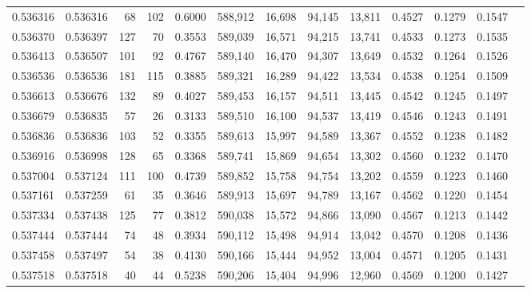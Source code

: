 \begin{tabular}{rrrrrrrrrrrrr}
0.536316 & 0.536316 &    68 &   102 &                                     0.6000 & 588,912 &  16,698 &  94,145 &  13,811 & 0.4527 & 0.1279 & 0.1547 \\
0.536370 & 0.536397 &   127 &    70 &                                     0.3553 & 589,039 &  16,571 &  94,215 &  13,741 & 0.4533 & 0.1273 & 0.1535 \\
0.536413 & 0.536507 &   101 &    92 &                                     0.4767 & 589,140 &  16,470 &  94,307 &  13,649 & 0.4532 & 0.1264 & 0.1526 \\
0.536536 & 0.536536 &   181 &   115 &                                     0.3885 & 589,321 &  16,289 &  94,422 &  13,534 & 0.4538 & 0.1254 & 0.1509 \\
0.536613 & 0.536676 &   132 &    89 &                                     0.4027 & 589,453 &  16,157 &  94,511 &  13,445 & 0.4542 & 0.1245 & 0.1497 \\
0.536679 & 0.536835 &    57 &    26 &                                     0.3133 & 589,510 &  16,100 &  94,537 &  13,419 & 0.4546 & 0.1243 & 0.1491 \\
0.536836 & 0.536836 &   103 &    52 &                                     0.3355 & 589,613 &  15,997 &  94,589 &  13,367 & 0.4552 & 0.1238 & 0.1482 \\
0.536916 & 0.536998 &   128 &    65 &                                     0.3368 & 589,741 &  15,869 &  94,654 &  13,302 & 0.4560 & 0.1232 & 0.1470 \\
0.537004 & 0.537124 &   111 &   100 &                                     0.4739 & 589,852 &  15,758 &  94,754 &  13,202 & 0.4559 & 0.1223 & 0.1460 \\
0.537161 & 0.537259 &    61 &    35 &                                     0.3646 & 589,913 &  15,697 &  94,789 &  13,167 & 0.4562 & 0.1220 & 0.1454 \\
0.537334 & 0.537438 &   125 &    77 &                                     0.3812 & 590,038 &  15,572 &  94,866 &  13,090 & 0.4567 & 0.1213 & 0.1442 \\
0.537444 & 0.537444 &    74 &    48 &                                     0.3934 & 590,112 &  15,498 &  94,914 &  13,042 & 0.4570 & 0.1208 & 0.1436 \\
0.537458 & 0.537497 &    54 &    38 &                                     0.4130 & 590,166 &  15,444 &  94,952 &  13,004 & 0.4571 & 0.1205 & 0.1431 \\
0.537518 & 0.537518 &    40 &    44 &                                     0.5238 & 590,206 &  15,404 &  94,996 &  12,960 & 0.4569 & 0.1200 & 0.1427 \\

\end{tabular}
